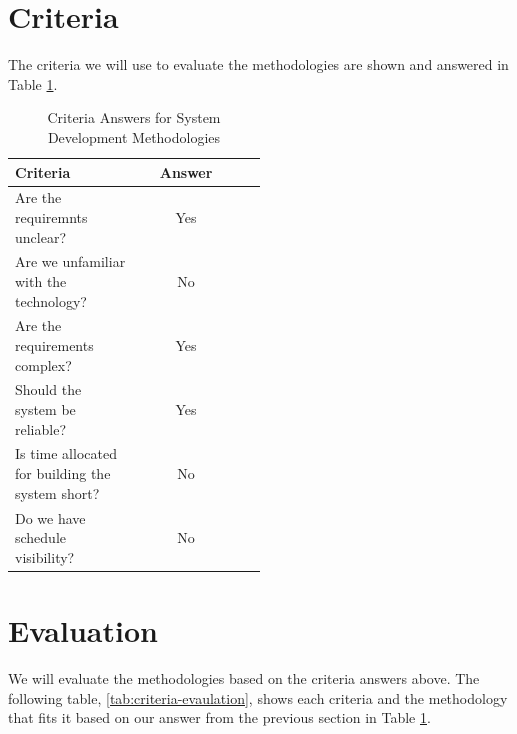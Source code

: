 \documentclass[a4paper]{report}
\begin{document}
\section{Criteria}

The criteria we will use to evaluate the methodologies are shown and answered in Table \ref{tab:criteria-answers}.

\begin{table}[htbp]
    \centering
    \caption{Criteria Answers for System Development Methodologies}
    \label{tab:criteria-answers}
    \begin{tabular}{@{}p{0.5\linewidth}cc@{}}
        \toprule
        Criteria                                         & Answer \\
        \midrule
        Are the requiremnts unclear?                     & Yes    \\
        Are we unfamiliar with the technology?           & No     \\
        Are the requirements complex?                    & Yes    \\
        Should the system be reliable?                   & Yes    \\
        Is time allocated for building the system short? & No     \\
        Do we have schedule visibility?                  & No     \\
        \bottomrule
    \end{tabular}
\end{table}

\section{Evaluation}

We will evaluate the methodologies based on the criteria answers above. The following table, \ref{tab:criteria-evaulation}, shows each criteria and the methodology that fits it based on our answer from the previous section in Table \ref{tab:criteria-answers}.
\end{document}

